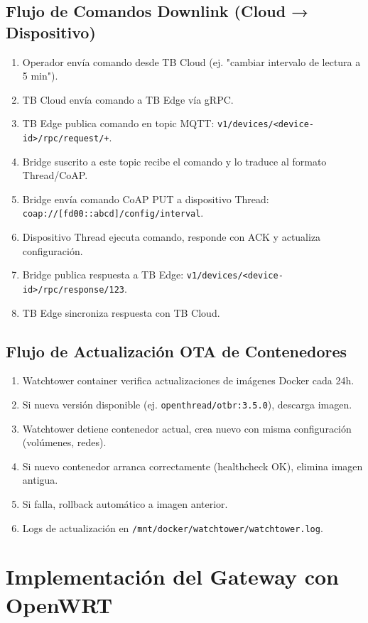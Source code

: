 \subsection{Flujo de Comandos Downlink (Cloud → Dispositivo)}

\begin{enumerate}
    \item Operador envía comando desde TB Cloud (ej. "cambiar intervalo de lectura a 5 min").
    \item TB Cloud envía comando a TB Edge vía gRPC.
    \item TB Edge publica comando en topic MQTT: \texttt{v1/devices/<device-id>/rpc/request/+}.
    \item Bridge suscrito a este topic recibe el comando y lo traduce al formato Thread/CoAP.
    \item Bridge envía comando CoAP PUT a dispositivo Thread: \texttt{coap://[fd00::abcd]/config/interval}.
    \item Dispositivo Thread ejecuta comando, responde con ACK y actualiza configuración.
    \item Bridge publica respuesta a TB Edge: \texttt{v1/devices/<device-id>/rpc/response/123}.
    \item TB Edge sincroniza respuesta con TB Cloud.
\end{enumerate}

\subsection{Flujo de Actualización OTA de Contenedores}

\begin{enumerate}
    \item Watchtower container verifica actualizaciones de imágenes Docker cada 24h.
    \item Si nueva versión disponible (ej. \texttt{openthread/otbr:3.5.0}), descarga imagen.
    \item Watchtower detiene contenedor actual, crea nuevo con misma configuración (volúmenes, redes).
    \item Si nuevo contenedor arranca correctamente (healthcheck OK), elimina imagen antigua.
    \item Si falla, rollback automático a imagen anterior.
    \item Logs de actualización en \texttt{/mnt/docker/watchtower/watchtower.log}.
\end{enumerate}

\section{Implementación del Gateway con OpenWRT}

